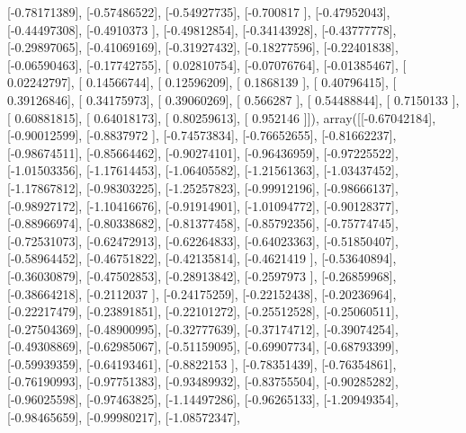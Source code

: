 \documentclass{article}
\begin{document}
       [-0.78171389],
       [-0.57486522],
       [-0.54927735],
       [-0.700817  ],
       [-0.47952043],
       [-0.44497308],
       [-0.4910373 ],
       [-0.49812854],
       [-0.34143928],
       [-0.43777778],
       [-0.29897065],
       [-0.41069169],
       [-0.31927432],
       [-0.18277596],
       [-0.22401838],
       [-0.06590463],
       [-0.17742755],
       [ 0.02810754],
       [-0.07076764],
       [-0.01385467],
       [ 0.02242797],
       [ 0.14566744],
       [ 0.12596209],
       [ 0.1868139 ],
       [ 0.40796415],
       [ 0.39126846],
       [ 0.34175973],
       [ 0.39060269],
       [ 0.566287  ],
       [ 0.54488844],
       [ 0.7150133 ],
       [ 0.60881815],
       [ 0.64018173],
       [ 0.80259613],
       [ 0.952146  ]]), array([[-0.67042184],
       [-0.90012599],
       [-0.8837972 ],
       [-0.74573834],
       [-0.76652655],
       [-0.81662237],
       [-0.98674511],
       [-0.85664462],
       [-0.90274101],
       [-0.96436959],
       [-0.97225522],
       [-1.01503356],
       [-1.17614453],
       [-1.06405582],
       [-1.21561363],
       [-1.03437452],
       [-1.17867812],
       [-0.98303225],
       [-1.25257823],
       [-0.99912196],
       [-0.98666137],
       [-0.98927172],
       [-1.10416676],
       [-0.91914901],
       [-1.01094772],
       [-0.90128377],
       [-0.88966974],
       [-0.80338682],
       [-0.81377458],
       [-0.85792356],
       [-0.75774745],
       [-0.72531073],
       [-0.62472913],
       [-0.62264833],
       [-0.64023363],
       [-0.51850407],
       [-0.58964452],
       [-0.46751822],
       [-0.42135814],
       [-0.4621419 ],
       [-0.53640894],
       [-0.36030879],
       [-0.47502853],
       [-0.28913842],
       [-0.2597973 ],
       [-0.26859968],
       [-0.38664218],
       [-0.2112037 ],
       [-0.24175259],
       [-0.22152438],
       [-0.20236964],
       [-0.22217479],
       [-0.23891851],
       [-0.22101272],
       [-0.25512528],
       [-0.25060511],
       [-0.27504369],
       [-0.48900995],
       [-0.32777639],
       [-0.37174712],
       [-0.39074254],
       [-0.49308869],
       [-0.62985067],
       [-0.51159095],
       [-0.69907734],
       [-0.68793399],
       [-0.59939359],
       [-0.64193461],
       [-0.8822153 ],
       [-0.78351439],
       [-0.76354861],
       [-0.76190993],
       [-0.97751383],
       [-0.93489932],
       [-0.83755504],
       [-0.90285282],
       [-0.96025598],
       [-0.97463825],
       [-1.14497286],
       [-0.96265133],
       [-1.20949354],
       [-0.98465659],
       [-0.99980217],
       [-1.08572347],
\end{document}
